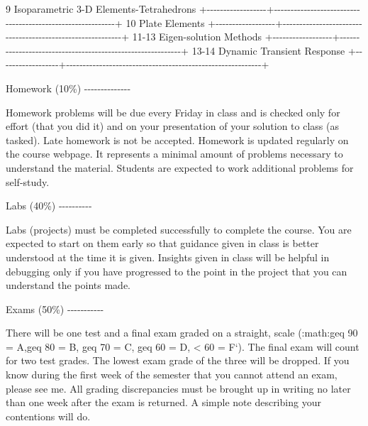 \textbar{} 9                \textbar{} Isoparametric 3-D Elements-Tetrahedrons                   \textbar{}
+-\/-\/-\/-\/-\/-\/-\/-\/-\/-\/-\/-\/-\/-\/-\/-\/-\/-+-\/-\/-\/-\/-\/-\/-\/-\/-\/-\/-\/-\/-\/-\/-\/-\/-\/-\/-\/-\/-\/-\/-\/-\/-\/-\/-\/-\/-\/-\/-\/-\/-\/-\/-\/-\/-\/-\/-\/-\/-\/-\/-\/-\/-\/-\/-\/-\/-\/-\/-\/-\/-\/-\/-\/-\/-\/-\/-+
\textbar{} 10               \textbar{} Plate Elements                                            \textbar{}
+-\/-\/-\/-\/-\/-\/-\/-\/-\/-\/-\/-\/-\/-\/-\/-\/-\/-+-\/-\/-\/-\/-\/-\/-\/-\/-\/-\/-\/-\/-\/-\/-\/-\/-\/-\/-\/-\/-\/-\/-\/-\/-\/-\/-\/-\/-\/-\/-\/-\/-\/-\/-\/-\/-\/-\/-\/-\/-\/-\/-\/-\/-\/-\/-\/-\/-\/-\/-\/-\/-\/-\/-\/-\/-\/-\/-+
\textbar{} 11-13            \textbar{} Eigen-solution Methods                                    \textbar{}
+-\/-\/-\/-\/-\/-\/-\/-\/-\/-\/-\/-\/-\/-\/-\/-\/-\/-+-\/-\/-\/-\/-\/-\/-\/-\/-\/-\/-\/-\/-\/-\/-\/-\/-\/-\/-\/-\/-\/-\/-\/-\/-\/-\/-\/-\/-\/-\/-\/-\/-\/-\/-\/-\/-\/-\/-\/-\/-\/-\/-\/-\/-\/-\/-\/-\/-\/-\/-\/-\/-\/-\/-\/-\/-\/-\/-+
\textbar{} 13-14            \textbar{} Dynamic Transient Response                                \textbar{}
+-\/-\/-\/-\/-\/-\/-\/-\/-\/-\/-\/-\/-\/-\/-\/-\/-\/-+-\/-\/-\/-\/-\/-\/-\/-\/-\/-\/-\/-\/-\/-\/-\/-\/-\/-\/-\/-\/-\/-\/-\/-\/-\/-\/-\/-\/-\/-\/-\/-\/-\/-\/-\/-\/-\/-\/-\/-\/-\/-\/-\/-\/-\/-\/-\/-\/-\/-\/-\/-\/-\/-\/-\/-\/-\/-\/-+



Homework (10\%)
-\/-\/-\/-\/-\/-\/-\/-\/-\/-\/-\/-\/-\/-

Homework problems will be due every Friday in class and is checked
only for effort (that you did it) and on your presentation of your
solution to class (as tasked). Late homework is not be accepted.
Homework is updated regularly on the course webpage. It represents a
minimal amount of problems necessary to understand the material.
Students are expected to work additional problems for self-study.

Labs (40\%)
-\/-\/-\/-\/-\/-\/-\/-\/-\/-

Labs (projects) must be completed successfully to complete the course.
You are expected to start on them early so that guidance given in class
is better understood at the time it is given. Insights given in class
will be helpful in debugging only if you have progressed to the point in
the project that you can understand the points made.

Exams (50\%)
-\/-\/-\/-\/-\/-\/-\/-\/-\/-\/-

There will be one test and a final exam graded on a straight, scale
(:math:geq 90 = A,geq 80 = B, geq 70 = C, geq 60 = D, \textless{} 60 =
F`). The final exam will count for two test grades. The lowest exam
grade of the three will be dropped. If you know during the first week of
the semester that you cannot attend an exam, please see me. All grading
discrepancies must be brought up in writing no later than one week after
the exam is returned. A simple note describing your contentions will do.

